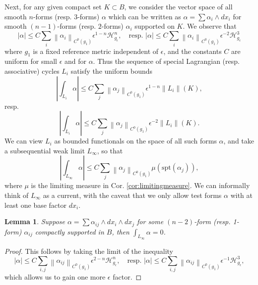 \documentclass{article}
\newtheorem{lem}[thm]{Lemma}
\theoremstyle{definition}
\newcommand{\norm}[1]{\left\lVert#1\right\rVert}
\begin{document}
				
				Next, for any given compact set $K\subset B$, we consider the vector space of all smooth $n$-forms (resp. $3$-forms) $\alpha$  which can be written as 
		$
				\alpha=\sum \alpha_i\wedge dx_i
			$
				for smooth $(n-1)$-forms  (resp. $2$-forms) $\alpha_i$ supported on $K$. 	We observe that 
				\[
				|\alpha| \leq  C\sum_i \norm{\alpha_i}_{C^0(g_1)} \epsilon^{1-n }   \mathcal{H}^n_{g_\epsilon} ,\quad \text{resp. } |\alpha | \leq  C \sum_i \norm{\alpha_i}_{C^0(g_1)}\epsilon^{-2 }\mathcal{H}^3_{g_\epsilon}
				\]
			where $g_1$ is a fixed reference metric independent of $\epsilon$, and the constants $C$ are uniform for small $\epsilon$ and for $\alpha$. Thus the sequence of special Lagrangian (resp. associative) cycles $L_i$ satisfy the uniform bounds
			\[
		|	\int_{L_i} \alpha | \leq C\sum_j \norm{\alpha_j}_{C^0(g_1)} \epsilon^{1-n }   \norm{L_i}(K) ,
			\]
				resp.
				\[
					|	\int_{L_i} \alpha | \leq C\sum_j \norm{\alpha_j}_{C^0(g_1)} \epsilon^{-2 }   \norm{L_i}(K).
				\]
				We can view $L_i$ as bounded functionals on the space of all such forms $\alpha$, and take a subsequential weak limit $L_\infty$, so that 
				\begin{equation}\label{eqn:Linftybounded}
					|	\int_{L_\infty} \alpha | \leq C\sum_j \norm{\alpha_j}_{C^0(g_1)} \mu(\text{spt} (\alpha_j)),
				\end{equation}
				where $\mu$ is the limiting measure in Cor. \ref{cor:limitingmeasure}. We can informally think of $L_\infty$ as a current, with the caveat that we only allow test forms $\alpha$ with at least one base factor $dx_i$.
		
		
		
		\begin{lem}\label{lem:limitcurrent1}
		Suppose $\alpha= \sum \alpha_{ij} \wedge dx_i\wedge dx_j$ for some $(n-2)$-form (resp. 1-form) $\alpha_{ij}$ compactly supported in $B$, then $\int_{L_\infty} \alpha=0$.
		\end{lem}
		
		
		
		
		\begin{proof}
		This follows by taking the limit of the inequality
		\[
			|\alpha| \leq  C\sum_{i,j}\norm{\alpha_{ij}}_{C^0(g_1)} \epsilon^{2-n }   \mathcal{H}^n_{g_\epsilon} ,\quad \text{resp. } |\alpha| \leq  C \sum_{i,j} \norm{\alpha_{ij}}_{C^0(g_1)}\epsilon^{-1 }\mathcal{H}^3_{g_\epsilon},
		\]
		which allows us to gain one more $\epsilon$ factor.
		\end{proof}
		
		
		
\end{document}
